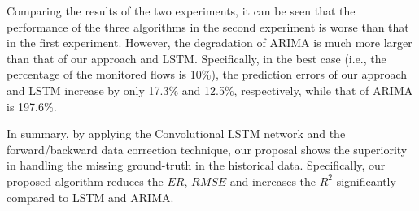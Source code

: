 Comparing the results of the two experiments, it can be seen that the performance of the three algorithms in the second experiment is worse than that in the first experiment. 
However, the degradation of ARIMA is much more larger than that of our approach and LSTM. 
Specifically, in the best case (i.e., the percentage of the monitored flows is 10$\%$), the prediction errors of our approach and LSTM increase by only 17.3$\%$ and 12.5$\%$, respectively, while that of ARIMA is 197.6$\%$. 

In summary, by applying the Convolutional LSTM network and the forward/backward data correction technique, our proposal shows the superiority in handling the missing ground-truth in the historical data.
Specifically, our proposed algorithm reduces the $ER$, $RMSE$ and increases the $R^2$ significantly compared to LSTM and ARIMA. 

